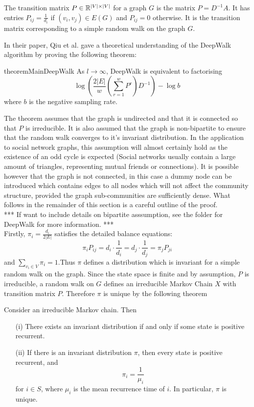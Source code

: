 \documentclass[a4paper]{article}
\begin{document}
\begin{definition}
  The transition matrix $P \in \R^{|V| \times |V|}$ for a graph $G$ is the
  matrix $P = D^{-1}A$. It has entries $P_{ij} = \frac{1}{d_i}$ if $(v_i, v_j)
  \in E(G)$ and $P_{ij} = 0$ otherwise. It is the transition matrix
  corresponding to a simple random walk on the graph $G$. 
\end{definition}
In their paper, Qiu et al. gave a theoretical understanding of the DeepWalk
algorithm by proving the following theorem:
\begin{restatable}{theorem}{MainDeepWalk}
  As $l \to \infty$, DeepWalk is equivalent to factorising
  \[\log{\left(\frac{2|E|}{w}\left( \sum_{r = 1}^w P^r  \right) D^{-1}
      \right)} - \log{b}\]
  where $b$ is the negative sampling rate.
\end{restatable}
The theorem assumes that the graph is undirected and that it is connected so
that $P$ is irreducible. It is also assumed that the graph is
non-bipartite to ensure that the random walk converges to it's invariant distribution. In the application to
social network graphs, this
assumption will almost certainly hold as the existence of an odd cycle is
expected (Social networks usually contain a large amount of triangles,
representing mutual friends or connections). It is possible however that the
graph is not connected, in this case a dummy node can be introduced which
contains edges to all nodes which will not affect the community structure,
provided the graph sub-communities are sufficiently dense.
What follows in the remainder of this section is a careful outline of the proof.\\
*** If want to include details on bipartite asssumption, see the folder for
DeepWalk for more information. ***\\
Firstly, $\pi_i = \frac{d_i}{2|E|}$ satisfies the detailed balance equations:
\[\pi_i P_{ij} = d_i\cdot \frac{1}{d_i} = d_j \cdot \frac{1}{d_j} = \pi_j P_{ji}\]
and $\sum_{v_i \in V} \pi_i = 1$.Thus $\pi$ defines a distribution which is
invariant for a simple random walk on the graph. Since the state space is
finite and by assumption, $P$ is irreducible, a random walk on $G$ defines an
irreducible Markov Chain $X$ with transition matrix $P$. Therefore $\pi$ is
unique by the following theorem
\begin{theorem}
  Consider an irreducible Markov chain. Then
  \begin{itemize}
  \item[(i)] There exists an invariant distribution if and only if some state is
    positive recurrent.
  \item[(ii)] If there is an invariant distribution $\pi$, then every state is
    positive recurrent, and
    \[\pi_i = \frac{1}{\mu_i}\]
    for $i \in S$, where $\mu_i$ is the mean recurrence time of $i$. In
    particular, $\pi$ is unique.
  \end{itemize}
\end{theorem}
\end{document}
